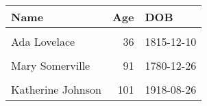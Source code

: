 \begin{table}
\centering
\begin{tabular}{lrl}
\toprule
Name & Age & DOB\\
\midrule
\cellcolor{gray!6}{Charles Babbage} & \cellcolor{gray!6}{79} & \cellcolor{gray!6}{1791-12-26}\\
Ada Lovelace & 36 & 1815-12-10\\
\cellcolor{gray!6}{Alan Turing} & \cellcolor{gray!6}{41} & \cellcolor{gray!6}{1912-06-23}\\
Mary Somerville & 91 & 1780-12-26\\
\cellcolor{gray!6}{John Conway} & \cellcolor{gray!6}{82} & \cellcolor{gray!6}{1937-12-26}\\
\addlinespace
Katherine Johnson & 101 & 1918-08-26\\
\bottomrule
\end{tabular}
\end{table}
